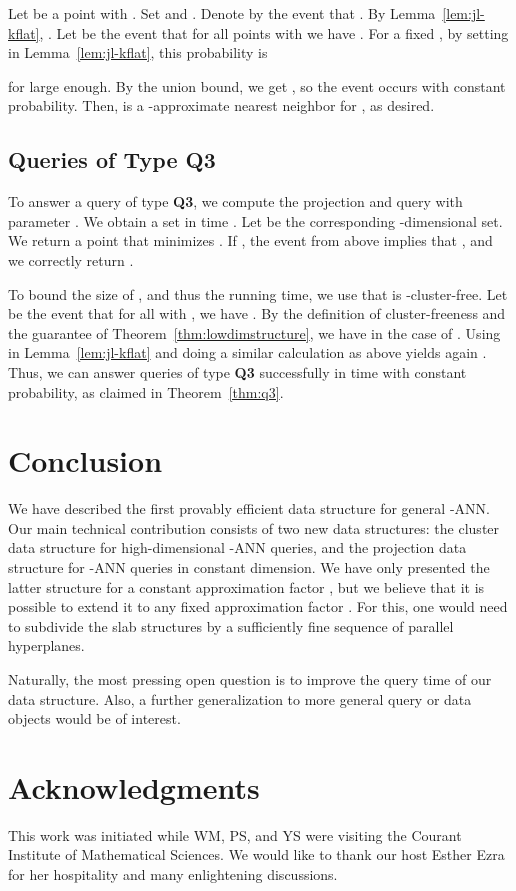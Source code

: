 \documentclass[a4paper,11pt]{paper}
\begin{document}
Let  be a point with .
Set  and
.
Denote by  the event that .
By Lemma~\ref{lem:jl-kflat},
.
Let  be the event that for all points  with
 we have
.
For a fixed , by setting 
in Lemma~\ref{lem:jl-kflat},
this probability is


for  large enough. By the union bound, we
get , so the event  occurs
with constant probability. Then,  is a
-approximate nearest neighbor for , as desired.


\subsection{Queries of Type Q3}

To answer a query of type \textbf{Q3},
we compute the projection  and query  with parameter
. We obtain
a set  in time
.
Let  be the corresponding -dimensional set.
We return a point  that minimizes .
If , the event  from above implies
that , and we correctly return .

To bound the size of , and thus the running time, we use
that  is -cluster-free.
Let  be the event that for all  with
, we have
.
By the definition of cluster-freeness and the guarantee of
Theorem~\ref{thm:lowdimstructure}, we have  in
the case of .
Using  in Lemma~\ref{lem:jl-kflat}
and doing
a similar calculation as above yields again .
Thus, we can answer queries of type \textbf{Q3} successfully
in time  with constant probability,
as claimed in
Theorem~\ref{thm:q3}.

\section{Conclusion}
We have described the first provably efficient
data structure for general -ANN.
Our main technical contribution consists of two
new data structures: the cluster data structure
for high-dimensional -ANN queries, and the
projection data structure for -ANN queries
in constant dimension. We have only
presented the latter structure for a constant approximation factor
, but we believe that it is possible to extend
it to any fixed approximation factor .
For this, one would need to subdivide the slab structures by
a sufficiently fine sequence of parallel hyperplanes.

Naturally, the most pressing open question is to improve the
query time of our data structure. Also, a further generalization
to more general query or data objects would be of interest.

\section*{Acknowledgments}
This work was initiated while WM, PS, and YS
were visiting the Courant Institute of Mathematical Sciences.
We would like to thank our host Esther Ezra for her hospitality
and many enlightening discussions.



\end{document}

